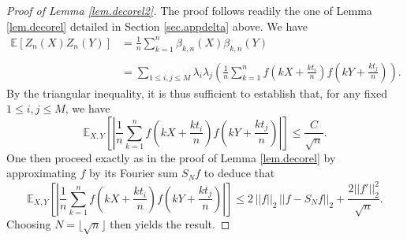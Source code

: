 \documentclass{svproc}
\begin{document}
\begin{proof}[Proof of Lemma \ref{lem.decorel2}]
The proof follows readily the one of Lemma \ref{lem.decorel} detailed in Section \ref{sec.appdelta} above. We have 
\[
\begin{array}{ll}
\displaystyle{\mathbb E[Z_n(X)Z_n(Y)] } &  \displaystyle{= \frac{1}{n}\sum_{k=1}^n \beta_{k,n}(X)\beta_{k,n}(Y) }\\
\\ & \displaystyle{=\sum_{1\leq i,j\leq M} \lambda_i \lambda_j \left(\frac{1}{n}\sum_{k=1}^n f\left(kX+\frac{kt_i}{n}\right)f\left(kY+\frac{kt_j}{n}\right)\right)} .
\end{array}
\]
By the triangular inequality, it is thus sufficient to establish that, for any fixed $1\leq i,j\leq M$, we have 
\[
\mathbb E_{X,Y}\left[ \left|\frac{1}{n}\sum_{k=1}^n f\left(kX+\frac{kt_i}{n}\right)f\left(kY+\frac{kt_j}{n}\right)\right|\right] \leq \frac{C}{\sqrt{n}}.
\]
One then proceed exactly as in the proof of Lemma \ref{lem.decorel} by approximating $f$ by its Fourier sum $S_N f$ to deduce that 
\[
\mathbb E_{X,Y}\left[ \left|\frac{1}{n}\sum_{k=1}^n f\left(kX+\frac{kt_i}{n}\right)f\left(kY+\frac{kt_j}{n}\right)\right|\right]\leq 2\, ||f||_2 \, ||f-S_Nf ||_2 + \frac{2 ||f'||_2^2}{\sqrt{n}}.
\]
Choosing $N=\lfloor\sqrt{n}\rfloor$ then yields the result.
\end{proof}
\end{document}
